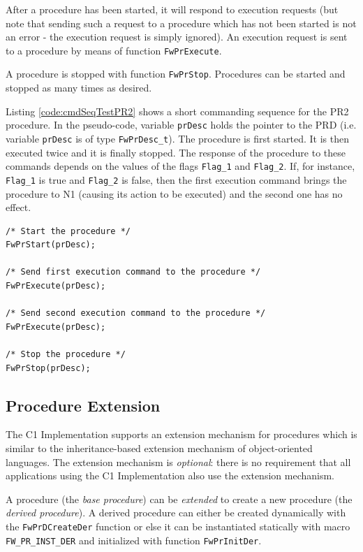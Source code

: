\documentclass[a4paper,10pt]{article}
\begin{document}
After a procedure has been started, it will respond to execution requests (but note that sending 
such a request to a procedure which has not been started is not an error - the execution request is simply ignored). 
An execution request is sent to a procedure by means of function \texttt{FwPrExecute}. 

A procedure is stopped with function \texttt{FwPrStop}. Procedures can be started and stopped as many times 
as desired.

Listing \ref{code:cmdSeqTestPR2} shows a short commanding sequence for the PR2 procedure. In the pseudo-code, variable 
\texttt{prDesc} holds the pointer to the PRD (i.e. variable \texttt{prDesc} is of type \texttt{FwPrDesc\_t}). 
The procedure is first started. 
It is then executed twice and it is finally stopped. 
The response of the procedure to these commands depends on the values of the flags \texttt{Flag\_1} and \texttt{Flag\_2}. 
If, for instance, \texttt{Flag\_1} is true and \texttt{Flag\_2} is false, then the first execution command brings 
the procedure to N1 (causing its action to be executed) and the second one has no effect.


\begin{lstlisting}
/* Start the procedure */
FwPrStart(prDesc);

/* Send first execution command to the procedure */
FwPrExecute(prDesc);

/* Send second execution command to the procedure */
FwPrExecute(prDesc);

/* Stop the procedure */
FwPrStop(prDesc);
\end{lstlisting}

\subsection{Procedure Extension}
The C1 Implementation supports an extension mechanism for procedures which is similar to the inheritance-based 
extension mechanism of object-oriented languages. The extension mechanism is \emph{optional}: there is no requirement 
that all applications using the C1 Implementation also use the extension mechanism.

A procedure (the \emph{base procedure}) can be \emph{extended} to create a new procedure 
(the \emph{derived procedure}). A derived procedure can either be created dynamically with the 
\texttt{FwPrDCreateDer} function or else it can be instantiated statically with macro \texttt{FW\_PR\_INST\_DER} and 
initialized with function \texttt{FwPrInitDer}.
\end{document}
